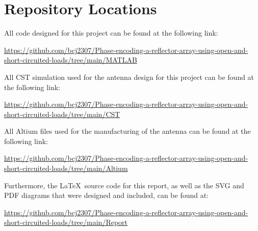%
%
\chapter{Repository Locations}
All code designed for this project can be found at the following link:

\begin{center}
    \url{https://github.com/bcj2307/Phase-encoding-a-reflector-array-using-open-and-short-circuited-loads/tree/main/MATLAB}
\end{center}

\vspace{1cm}

All CST simulation used for the antenna design for this project can be found at the following link:

\begin{center}
    \url{https://github.com/bcj2307/Phase-encoding-a-reflector-array-using-open-and-short-circuited-loads/tree/main/CST}
\end{center}

\vspace{1cm}

All Altium files used for the manufacturing of the antenna can be found at the following link:

\begin{center}
    \url{https://github.com/bcj2307/Phase-encoding-a-reflector-array-using-open-and-short-circuited-loads/tree/main/Altium}
\end{center}

\vspace{1cm}

Furthermore, the \LaTeX~source code for this report, as well as the SVG and PDF diagrams that were designed and included, can be found at:

\begin{center}
    \url{https://github.com/bcj2307/Phase-encoding-a-reflector-array-using-open-and-short-circuited-loads/tree/main/Report}
\end{center}
\ifstandalone
% 
\fi
%
